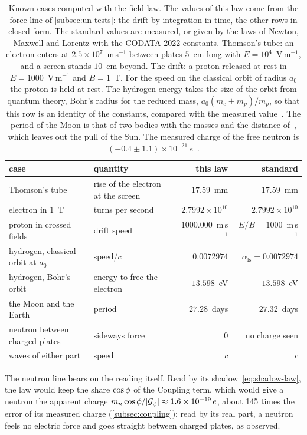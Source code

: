 \begin{table}[t]
\caption{Known cases computed with the field law. The values of this law come from the force line of \cref{subsec:un-tests}: the drift by integration in time, the other rows in closed form. The standard values are measured, or given by the laws of Newton, Maxwell and Lorentz with the CODATA 2022 constants. Thomson's tube: an electron enters at $2.5 \times 10^7$~m\,s$^{-1}$ between plates $5$~cm long with $E = 10^4$~V\,m$^{-1}$, and a screen stands $10$~cm beyond. The drift: a proton released at rest in $E = 1000$~V\,m$^{-1}$ and $B = 1$~T. For the speed on the classical orbit of radius $a_0$ the proton is held at rest. The hydrogen energy takes the size of the orbit from quantum theory, Bohr's radius for the reduced mass, $a_0(m_e + m_p)/m_p$, so that this row is an identity of the constants, compared with the measured value~\citep{Sansonetti2005}. The period of the Moon is that of two bodies with the masses and the distance of~\citep{NASAMoon}, which leaves out the pull of the Sun. The measured charge of the free neutron is $(-0.4 \pm 1.1) \times 10^{-21}\,e$~\citep{Baumann1988}.}
\label{tab:un-results}
\small
\begin{tabularx}{\textwidth}{@{}>{\raggedright\arraybackslash}X >{\raggedright\arraybackslash}p{} r r@{}}
\toprule
case & quantity & this law & standard \\
\midrule
Thomson's tube~\citep{Thomson1897} & rise of the electron at the screen & $17.59$~mm & $17.59$~mm \\
electron in $1$~T & turns per second & $2.7992 \times 10^{10}$ & $2.7992 \times 10^{10}$ \\
proton in crossed fields & drift speed & $1000.000$~m\,s$^{-1}$ & $E/B = 1000$~m\,s$^{-1}$ \\
hydrogen, classical orbit at $a_0$ & speed$/c$ & $0.0072974$ & $\alpha_{\mathrm{fs}} = 0.0072974$ \\
hydrogen, Bohr's orbit & energy to free the electron & $13.598$~eV & $13.598$~eV \\
the Moon and the Earth & period & $27.28$~days & $27.32$~days \\
neutron between charged plates & sideways force & $0$ & no charge seen \\
waves of either part & speed & $c$ & $c$ \\
\bottomrule
\end{tabularx}
\end{table}

The neutron line bears on the reading itself. Read by its shadow~\cref{eq:shadow-law}, the law would keep the share $\cos\bar{\phi}$ of the Coupling term, which would give a neutron the apparent charge $m_n\cos\bar{\phi}/\lvert\mathcal{G}_{\bar{\phi}}\rvert \approx 1.6 \times 10^{-19}\,e$, about 145 times the error of its measured charge (\cref{subsec:coupling}); read by its real part, a neutron feels no electric force and goes straight between charged plates, as observed.

